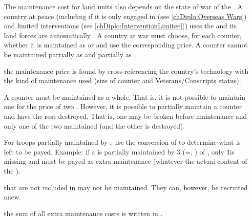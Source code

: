 \aparag The maintenance cost for land units also depends on the state of war
of the \MAJ.
\bparag A country at peace (including if it is only engaged in  (see \ref{chDiplo:Overseas Wars}) and limited interventions (see
\ref{chDiplo:InterventionLimitee})) uses the  and its
land forces are automatically .
\bparag A country at war must choose, for each counter, whether it is
maintained as  or  and use the corresponding
price.
\bparag A counter cannot be maintained partially as  and
partially as .

\aparag the maintenance price is found by cross-referencing the country's
technology with the kind of maintenance used (size of counter and
Veterans/Conscripts status).

\aparag A counter must be maintained as a whole. That is, it is not possible
to maintain one \ARMY\Facemoins for the price of two \LD.
\bparag However, it is possible to partially maintain a counter and have the
rest destroyed. That is, one \ARMY\Facemoins may be broken before maintenance
and only one of the two \LD maintained (and the other is destroyed).

\aparag For troops partially maintained by , use the
conversion of  to determine what is left to be payed.
\bparag Example: if a \FLEET\Faceplus is partially maintained by 3\ND
(=\FLEET\Facemoins, \ND) of , only 1\ND is missing and must
be payed as extra maintenance (whatever the actual content of the \FLEET).

\aparag \corsaire that are not included in  may not be
maintained. They can, however, be recruited anew.


\aparag the sum of all extra maintenance costs is written in .

